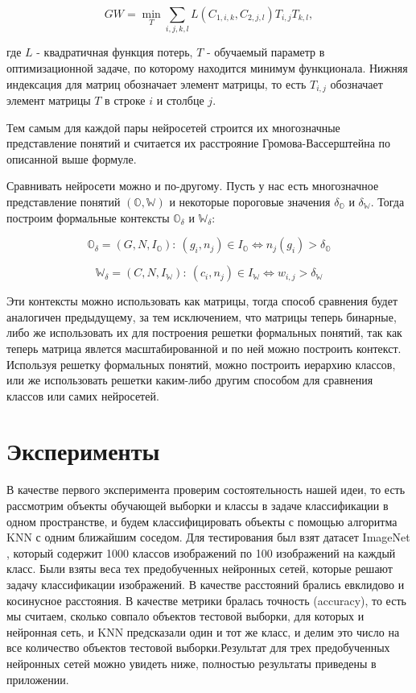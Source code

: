 \documentclass{article}
\begin{document}
$$GW = \min_T \sum_{i, j, k, l} L(C_{1, i, k}, C_{2, j, l}) T_{i, j} T_{k, l}, $$

где $L$ - квадратичная функция потерь, $T$ - обучаемый параметр в оптимизационной задаче, по которому находится минимум функционала. Нижняя индексация для матриц обозначает элемент матрицы, то есть $T_{i, j}$ обозначает элемент матрицы $T$ в строке $i$ и столбце $j$.

Тем самым для каждой пары нейросетей строится их многозначные представление понятий и считается их расстрояние Громова-Вассерштейна по описанной выше формуле.

Сравнивать нейросети можно и по-другому. Пусть у нас есть многозначное представление понятий $(\mathbb{O}, \mathbb{W})$ и некоторые пороговые значения $\delta_\mathbb{O}$ и $\delta_\mathbb{W}$. Тогда построим формальные контексты $\mathbb{O}_\delta$ и $\mathbb{W}_\delta$:

$$ \mathbb{O}_\delta = (G, N, I_\mathbb{O}): \: (g_i, n_j) \in I_\mathbb{O} \iff n_j(g_i) > \delta_\mathbb{O}$$

$$ \mathbb{W}_\delta = (C, N, I_\mathbb{W}): \: (c_i, n_j) \in I_\mathbb{W} \iff w_{i, j} > \delta_\mathbb{W}$$

Эти контексты можно использовать как матрицы, тогда способ сравнения будет аналогичен предыдущему, за тем исключением, что матрицы теперь бинарные, либо же использовать их для построения решетки формальных понятий, так как теперь матрица явлется масштабированной и по ней можно построить контекст. Используя решетку формальных понятий, можно построить иерархию классов, или же использовать решетки каким-либо другим способом для сравнения классов или самих нейросетей.

\section{Эксперименты}

В качестве первого эксперимента проверим состоятельность нашей идеи, то есть рассмотрим объекты обучающей выборки и классы в задаче классификации в одном пространстве, и будем классифицировать объекты с помощью алгоритма KNN с одним ближайшим соседом. Для тестирования был взят датасет ImageNet \citep{dataset}, который содержит 1000 классов изображений по 100 изображений на каждый класс. Были взяты веса тех предобученных нейронных сетей, которые решают задачу классификации изображений. В качестве расстояний брались евклидово и косинусное расстояния. В качестве метрики бралась точность (accuracy), то есть мы считаем, сколько совпало объектов тестовой выборки, для которых и нейронная сеть, и KNN предсказали один и тот же класс, и делим это число на все количество объектов тестовой выборки.Результат для трех предобученных нейронных сетей можно увидеть ниже, полностью результаты приведены в приложении.
\end{document}
